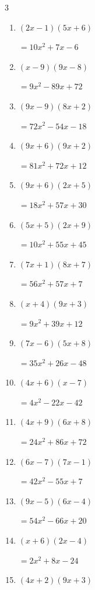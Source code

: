 \begin{multicols}{3}
\begin{enumerate}
  \itemsep=10pt
  \item $(2x-1)(5x+6)$

        $=10x^{2}+7x-6$

  \item $(x-9)(9x-8)$

        $=9x^{2}-89x+72$

  \item $(9x-9)(8x+2)$

        $=72x^{2}-54x-18$

  \item $(9x+6)(9x+2)$

        $=81x^{2}+72x+12$

  \item $(9x+6)(2x+5)$

        $=18x^{2}+57x+30$

  \item $(5x+5)(2x+9)$

        $=10x^{2}+55x+45$

  \item $(7x+1)(8x+7)$

        $=56x^{2}+57x+7$

  \item $(x+4)(9x+3)$

        $=9x^{2}+39x+12$

  \item $(7x-6)(5x+8)$

        $=35x^{2}+26x-48$

  \item $(4x+6)(x-7)$

        $=4x^{2}-22x-42$

  \item $(4x+9)(6x+8)$

        $=24x^{2}+86x+72$

  \item $(6x-7)(7x-1)$

        $=42x^{2}-55x+7$

  \item $(9x-5)(6x-4)$

        $=54x^{2}-66x+20$

  \item $(x+6)(2x-4)$

        $=2x^{2}+8x-24$

  \item $(4x+2)(9x+3)$


\end{enumerate}
\end{multicols}
